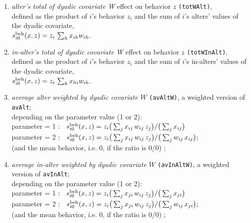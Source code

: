 \documentclass[a4paper,fleqn,11pt]{article}
\newcommand{\+}{\, + \,}
\newcommand{\vit}{\theenumi}
\begin{document}
\begin{enumerate}
\item \emph{alter's  total of dyadic covariate W } effect on behavior $z$
 \texttt{(totWAlt)},\\
      defined as the product of $i$'s behavior $z_i$ and
      the sum of $i$'s alters' values of the dyadic covariate, \\
       $s^{\rm beh}_{i\vit}(x, z) = z_i \, \sum_h x_{ih}w_{ih}  $.\\

\item \emph{in-alter's  total of dyadic covariate W } effect on behavior $z$
 \texttt{(totWInAlt)},\\
      defined as the product of $i$'s behavior $z_i$ and
      the sum of $i$'s in-alters' values of the dyadic covariate, \\
       $s^{\rm beh}_{i\vit}(x, z) = z_i \, \sum_h x_{hi}w_{ih}  $.\\

 \item {\em average alter weighted by dyadic covariate $W$}
                       \texttt{(avAltW)},
                       a weighted version of  \texttt{avAlt};\\
                       depending on the parameter value (1 or 2):\\
  parameter = 1 : \ $s^{\rm beh}_{i\vit}(x, z) =
                     z_i \big( \sum_j x_{ij} \, w_{ij} \, z_j \big)  /
                                        \big (\sum_j x_{ij}\big)$\\
   parameter = 2 : \  $s^{\rm beh}_{i\vit}(x, z) =
                    z_i \big( \sum_j x_{ij} \, w_{ij} \, z_j \big)  /
                                \big (\sum_j w_{ij} \,x_{ij}\big) ;$\\
 (and the mean behavior, i.e. $0$, if the ratio is 0/0) ;

  \item {\em average in-alter weighted by dyadic covariate $W$}
                       \texttt{(avInAltW)},
                       a weighted version of  \texttt{avInAlt};\\
                       depending on the parameter value (1 or 2):\\
  parameter = 1 : \ $s^{\rm beh}_{i\vit}(x, z) =
                     z_i \big( \sum_j x_{ji} \, w_{ij} \, z_j \big)  /
                                        \big (\sum_j x_{ji}\big)$\\
   parameter = 2 : \  $s^{\rm beh}_{i\vit}(x, z) =
                    z_i \big( \sum_j x_{ji} \, w_{ij} \, z_j \big)  /
                                \big (\sum_j w_{ij} \,x_{ji}\big) ;$\\
 (and the mean behavior, i.e. $0$, if the ratio is 0/0) ;


\end{enumerate}
\end{document}
